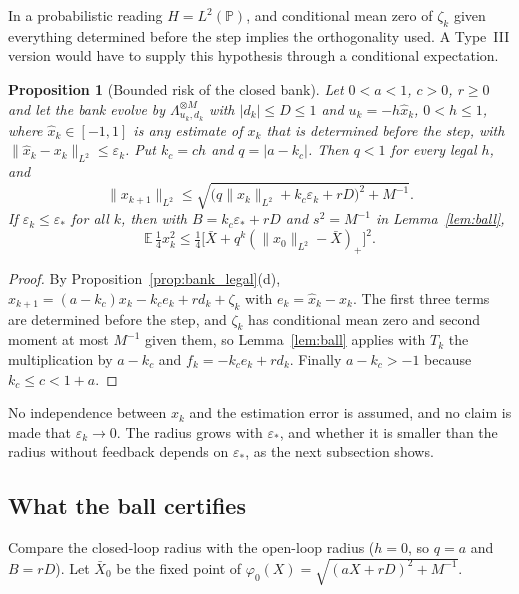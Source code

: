 \documentclass[12pt]{article}
\newtheorem{proposition}[theorem]{Proposition}
\theoremstyle{definition}
\theoremstyle{remark}
\begin{document}
In a probabilistic reading $H=L^2(\mathbb P)$, and conditional mean zero of $\zeta_k$ given everything determined before the step implies the orthogonality used. A Type~III version would have to supply this hypothesis through a conditional expectation.

\begin{proposition}[Bounded risk of the closed bank]\label{prop:bank_ball}
Let $0<a<1$, $c>0$, $r\ge0$ and let the bank evolve by $\Lambda_{u_k,d_k}^{\otimes M}$ with $|d_k|\le D\le1$ and $u_k=-h\hat x_k$, $0<h\le1$, where $\hat x_k\in[-1,1]$ is any estimate of $x_k$ that is determined before the step, with $\|\hat x_k-x_k\|_{L^2}\le\varepsilon_k$. Put $k_c=ch$ and $q=|a-k_c|$. Then $q<1$ for every legal $h$, and
\[
\|x_{k+1}\|_{L^2}\le\sqrt{\bigl(q\|x_k\|_{L^2}+k_c\varepsilon_k+rD\bigr)^2+M^{-1}} .
\]
If $\varepsilon_k\le\varepsilon_*$ for all $k$, then with $B=k_c\varepsilon_*+rD$ and $s^2=M^{-1}$ in Lemma~\ref{lem:ball},
\[
\mathbb E\,\tfrac14x_k^2\le\tfrac14\bigl[\bar X+q^k(\|x_0\|_{L^2}-\bar X)_+\bigr]^2 .
\]
\end{proposition}
\begin{proof}
By Proposition~\ref{prop:bank_legal}(d), $x_{k+1}=(a-k_c)x_k-k_ce_k+rd_k+\zeta_k$ with $e_k=\hat x_k-x_k$. The first three terms are determined before the step, and $\zeta_k$ has conditional mean zero and second moment at most $M^{-1}$ given them, so Lemma~\ref{lem:ball} applies with $T_k$ the multiplication by $a-k_c$ and $f_k=-k_ce_k+rd_k$. Finally $a-k_c>-1$ because $k_c\le c<1+a$.
\end{proof}

No independence between $x_k$ and the estimation error is assumed, and no claim is made that $\varepsilon_k\to0$. The radius grows with $\varepsilon_*$, and whether it is smaller than the radius without feedback depends on $\varepsilon_*$, as the next subsection shows.

\subsection{What the ball certifies}\label{subsec:bank_cert}

Compare the closed-loop radius with the open-loop radius ($h=0$, so $q=a$ and $B=rD$). Let $\bar X_0$ be the fixed point of $\varphi_0(X)=\sqrt{(aX+rD)^2+M^{-1}}$.
\end{document}
